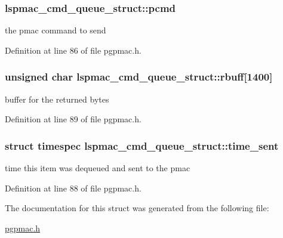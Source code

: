 \hypertarget{structlspmac__cmd__queue__struct_a9ac7618bbe0faa3001e8efeb1d89010d}{
\subsubsection[{pcmd}]{ lspmac\-\_\-cmd\-\_\-queue\-\_\-struct\-::pcmd}}\label{structlspmac__cmd__queue__struct_a9ac7618bbe0faa3001e8efeb1d89010d}


the pmac command to send 



Definition at line 86 of file pgpmac.\-h.

\hypertarget{structlspmac__cmd__queue__struct_aa059563886db174f9bb4f7a14bc19bbe}{
\subsubsection[{rbuff}]{\setlength{\rightskip}{0pt plus 5cm}unsigned char lspmac\-\_\-cmd\-\_\-queue\-\_\-struct\-::rbuff\mbox{[}1400\mbox{]}}}\label{structlspmac__cmd__queue__struct_aa059563886db174f9bb4f7a14bc19bbe}


buffer for the returned bytes 



Definition at line 89 of file pgpmac.\-h.

\hypertarget{structlspmac__cmd__queue__struct_a276ebc4b35c2554e4cb7377b60fd89b7}{
\subsubsection[{time\-\_\-sent}]{\setlength{\rightskip}{0pt plus 5cm}struct timespec lspmac\-\_\-cmd\-\_\-queue\-\_\-struct\-::time\-\_\-sent}}\label{structlspmac__cmd__queue__struct_a276ebc4b35c2554e4cb7377b60fd89b7}


time this item was dequeued and sent to the pmac 



Definition at line 88 of file pgpmac.\-h.



The documentation for this struct was generated from the following file\-:\begin{DoxyCompactItemize}
\item 
\hyperlink{pgpmac_8h}{pgpmac.\-h}\end{DoxyCompactItemize}
